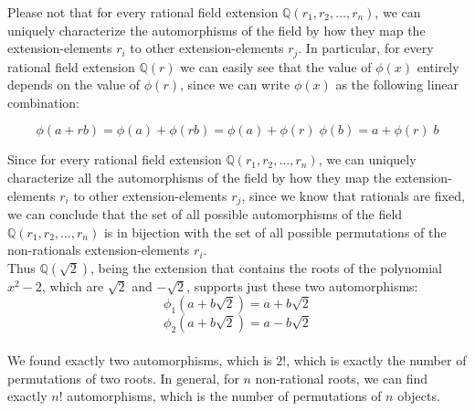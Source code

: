 \begin{lemma}
Please not that for every rational field extension $\mathbb{Q}(r_1, r_2, \dots, r_n)$, we can uniquely
characterize the automorphisms of the field by how they map the extension-elements $r_i$ to other
extension-elements $r_j$. In particular, for every rational field extension $\mathbb{Q}(r)$ we can 
easily see that the value of $\phi(x)$ entirely depends on the value of $\phi(r)$, since we can
write $\phi(x)$ as the following linear combination:

$$ \phi(a + rb) = \phi(a) + \phi(rb) = \phi(a) + \phi(r)\;\phi(b) = a + \phi(r)\;b $$
\end{lemma}

\newpage

Since for every rational field extension $\mathbb{Q}(r_1, r_2, \dots, r_n)$, we can uniquely characterize 
all the automorphisms of the field by how they map the extension-elements $r_i$ to other
extension-elements $r_j$, since we know that rationals are fixed, we can conclude that the set of 
all possible automorphisms of the field $\mathbb{Q}(r_1, r_2, \dots, r_n)$ is in bijection with the
set of all possible permutations of the non-rationals extension-elements $r_i$. \\

Thus $\mathbb{Q}(\sqrt{2})$, being the extension 
that contains the roots of the polynomial $x^2 - 2$, which are $\sqrt{2}$ and $-\sqrt{2}$, supports 
just these two automorphisms: \\

$$ \phi_1(a + b\sqrt{2}) = a + b\sqrt{2} $$
$$ \phi_2(a + b\sqrt{2}) = a - b\sqrt{2} $$ \\

We found exactly two automorphisms, which is $2!$, which is exactly the number of
permutations of two roots. In general, for $n$ non-rational roots, we can find exactly $n!$ automorphisms, 
which is the number of permutations of $n$ objects. \\